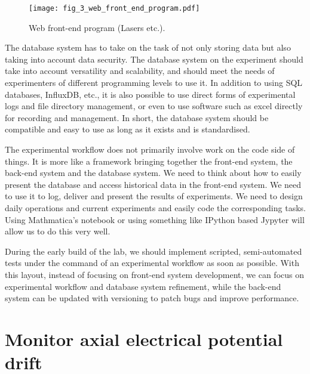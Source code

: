 \begin{figure}
    \centering
    \texttt{[image: fig\_3\_web\_front\_end\_program.pdf]}
    \caption{Web front-end program (Lasers etc.).}
\end{figure}

The database system has to take on the task of not only storing data but also taking into account data security. The database system on the experiment should take into account versatility and scalability, and should meet the needs of experimenters of different programming levels to use it. In addition to using SQL databases, InfluxDB, etc., it is also possible to use direct forms of experimental logs and file directory management, or even to use software such as excel directly for recording and management. In short, the database system should be compatible and easy to use as long as it exists and is standardised.

The experimental workflow does not primarily involve work on the code side of things. It is more like a framework bringing together the front-end system, the back-end system and the database system. We need to think about how to easily present the database and access historical data in the front-end system. We need to use it to log, deliver and present the results of experiments. We need to design daily operations and current experiments and easily code the corresponding tasks. Using Mathmatica's notebook or using something like IPython based Jypyter will allow us to do this very well.

During the early build of the lab, we should implement scripted, semi-automated tests under the command of an experimental workflow as soon as possible. With this layout, instead of focusing on front-end system development, we can focus on experimental workflow and database system refinement, while the back-end system can be updated with versioning to patch bugs and improve performance.



\section{Monitor axial electrical potential drift}

